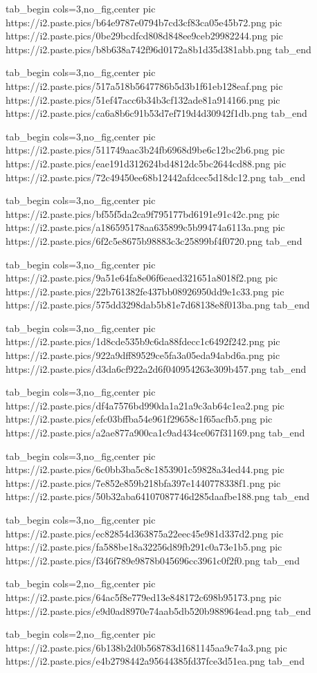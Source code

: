 \ifcmt
  tab_begin cols=3,no_fig,center
		pic https://i2.paste.pics/b64e9787e0794b7cd3cf83ca05e45b72.png
		pic https://i2.paste.pics/0be29bcdfcd808d848ee9ceb29982244.png
		pic https://i2.paste.pics/b8b638a742f96d0172a8b1d35d381abb.png
  tab_end
\fi

\ifcmt
  tab_begin cols=3,no_fig,center
		pic https://i2.paste.pics/517a518b5647786b5d3b1f61eb128eaf.png
		pic https://i2.paste.pics/51ef47acc6b34b3cf132ade81a914166.png
		pic https://i2.paste.pics/ca6a8b6c91b53d7ef719d4d30942f1db.png
  tab_end
\fi

\ifcmt
  tab_begin cols=3,no_fig,center
		pic https://i2.paste.pics/511749aac3b24fb6968d9be6c12bc2b6.png
		pic https://i2.paste.pics/eae191d312624bd4812dc5bc2644cd88.png
		pic https://i2.paste.pics/72c49450ee68b12442afdcec5d18dc12.png
  tab_end
\fi

\ifcmt
  tab_begin cols=3,no_fig,center
		pic https://i2.paste.pics/bf55f5da2ca9f795177bd6191e91c42c.png
		pic https://i2.paste.pics/a186595178aa635899c5b99474a6113a.png
		pic https://i2.paste.pics/6f2c5e8675b98883c3c25899bf4f0720.png
  tab_end
\fi

\ifcmt
  tab_begin cols=3,no_fig,center
		pic https://i2.paste.pics/9a51e64fa8e06f6eaed321651a8018f2.png
		pic https://i2.paste.pics/22b761382fe437bb08926950dd9e1c33.png
		pic https://i2.paste.pics/575dd3298dab5b81e7d68138e8f013ba.png
  tab_end
\fi

\ifcmt
  tab_begin cols=3,no_fig,center
		pic https://i2.paste.pics/1d8cde535b9c6da88fdecc1c6492f242.png
		pic https://i2.paste.pics/922a9dff89529ce5fa3a05eda94abd6a.png
		pic https://i2.paste.pics/d3da6cf922a2d6f040954263e309b457.png
  tab_end
\fi

\ifcmt
  tab_begin cols=3,no_fig,center
		pic https://i2.paste.pics/df4a7576bd990da1a21a9c3ab64c1ea2.png
		pic https://i2.paste.pics/efc03bffba54e961f29658c1f65acfb5.png
		pic https://i2.paste.pics/a2ae877a900ca1c9ad434ce067f31169.png
  tab_end
\fi

\ifcmt
  tab_begin cols=3,no_fig,center
		pic https://i2.paste.pics/6c0bb3ba5c8c1853901c59828a34ed44.png
		pic https://i2.paste.pics/7e852e859b218bfa397e1440778338f1.png
		pic https://i2.paste.pics/50b32aba64107087746d285daafbe188.png
  tab_end
\fi

\ifcmt
  tab_begin cols=3,no_fig,center
		pic https://i2.paste.pics/ec82854d363875a22eec45e981d337d2.png
		pic https://i2.paste.pics/fa588be18a32256d89fb291c0a73e1b5.png
		pic https://i2.paste.pics/f346f789e9878b045696cc3961c0f2f0.png
  tab_end
\fi

\ifcmt
  tab_begin cols=2,no_fig,center
		pic https://i2.paste.pics/64ac5f8e779ed13e848172c698b95173.png
		pic https://i2.paste.pics/e9d0ad8970e74aab5db520b988964ead.png
  tab_end
\fi

\ifcmt
  tab_begin cols=2,no_fig,center
		pic https://i2.paste.pics/6b138b2d0b568783d1681145aa9c74a3.png
		pic https://i2.paste.pics/e4b2798442a95644385fd37fce3d51ea.png
  tab_end
\fi
